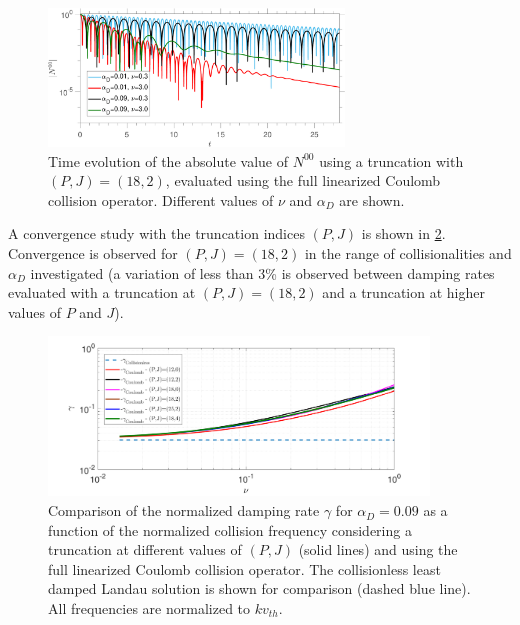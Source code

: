 \begin{figure}
    \centering
    \includegraphics[width=0.7\textwidth]{images/elDensity_of_t_nu_soundw1_pmaxe18_jmaxe4-eps-converted-to.pdf}
    \caption{Time evolution of the absolute value of $N^{00}$ using a truncation with $(P,J)=(18,2)${, evaluated using the full linearized Coulomb collision operator}. Different values of $\nu$ and $\alpha_D$ are shown.
    }
    \label{fig:timetraces}
\end{figure}

A convergence study with the truncation indices $(P,J)$ is shown in \cref{fig:convstudy}.
%
{Convergence is observed for $(P,J) = (18,2)$ in the range of collisionalities and $\alpha_D$ investigated  {(a variation of less than 3\% is observed between damping rates evaluated with a truncation at $(P,J) = (18,2)$ and a truncation at higher values of $P$ and $J$)}.}

\begin{figure}
    \centering
    \includegraphics[width=0.9\textwidth]{images/Convergence_Study.pdf}
    \caption{Comparison of the {normalized} damping rate $\gamma$ for $\alpha_D=0.09$ {as a function of the normalized collision frequency} considering a truncation at different values of $(P,J)$ (solid lines) {and using the full linearized Coulomb collision operator}.
    The collisionless least damped Landau solution is shown for comparison (dashed blue line).
    {All frequencies are normalized to $k v_{th}$.}
    }
    \label{fig:convstudy}
\end{figure}

